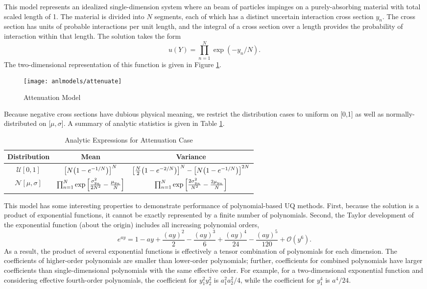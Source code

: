 This model represents an idealized single-dimension system where an beam of particles impinges on a
purely-absorbing material with total scaled length of 1.
The material is divided into $N$ segments, each of which
has a distinct uncertain interaction cross section $y_n$.  The cross section has units of probable interactions
per unit length, and the integral of a cross section over a length provides the probability of interaction
within that length.  The solution takes the form
\begin{equation}
  u(Y) = \prod_{n=1}^N \exp(-y_n/N).
\end{equation}
The two-dimensional representation of this function is given in Figure \ref{fig: attenuation}.
\begin{figure}[htb]
  \centering
  \texttt{[image: anlmodels/attenuate]}
  \caption{Attenuation Model}
  \label{fig: attenuation}
\end{figure}
Because negative cross sections have dubious physical meaning, we restrict the distribution cases to uniform
on [0,1] as well as normally-distributed on [$\mu,\sigma$].  A summary of analytic statistics is given in
Table \ref{tab:attenuation moments}.

\begin{table}[H]
  \centering
  \begin{tabular}{c|c|c}
    Distribution & Mean & Variance \\\hline
    $\mathcal{U}[0,1]$ & $\qty[N\qty(1-e^{-1/N})]^N$ & $\qty[\frac{N}{2}\qty(1-e^{-2/N})]^N -
                       \qty[N\qty(1-e^{-1/N})]^{2N}$ \\
    $\mathcal{N}[\mu,\sigma]$ & $\prod_{n=1}^N \exp\qty[\frac{\sigma_{y_n}^2}{2N^2}-\frac{\mu_{y_n}}{N}]$
    & $\prod_{n=1}^N \exp\qty[\frac{2\sigma_{y_n}^2}{N^2} - \frac{2\mu_{y_n}}{N}]$
  \end{tabular}
  \caption{Analytic Expressions for Attenuation Case}
  \label{tab:attenuation moments}
\end{table}

This model has some interesting properties to demonstrate performance of polynomial-based UQ methods.  First,
because the solution is a product of exponential functions, it cannot be exactly represented by a finite
number of polynomials.  Second, the Taylor development of the exponential function (about the origin) 
includes all increasing polynomial orders,
\begin{equation}
e^{ay} = 1 - ay + \frac{(ay)^2}{2} - \frac{(ay)^3}{6} + \frac{(ay)^4}{24} - \frac{(ay)^5}{120} + \mathcal{O}(y^6).
\end{equation}
As a result, the product of several exponential functions is effectively a tensor combination of
polynomials for each dimension.  The coefficients of higher-order polynomials are smaller than lower-order
polynomials; further, coefficients for combined polynomials have larger coefficients than single-dimensional
polynomials with the same effective order.  For example, for a two-dimensional exponential function and
considering effective fourth-order polynomials, the coefficient for $y_1^2y_2^2$ is $a_1^2a_2^2/4$, while the
coefficient for $y_1^4$ is $a^4/24$.

